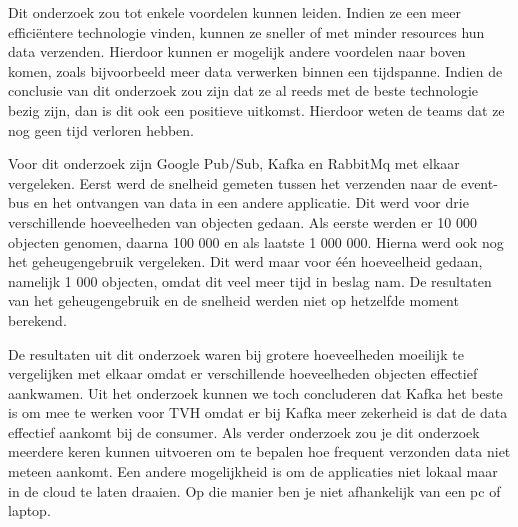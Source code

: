 Dit onderzoek zou tot enkele voordelen kunnen leiden. Indien ze een meer efficiëntere technologie vinden, kunnen ze sneller of met minder resources hun data verzenden. Hierdoor kunnen er mogelijk andere voordelen naar boven komen, zoals bijvoorbeeld meer data verwerken binnen een tijdspanne. Indien de conclusie van dit onderzoek zou zijn dat ze al reeds met de beste technologie bezig zijn, dan is dit ook een positieve uitkomst. Hierdoor weten de teams dat ze nog geen tijd verloren hebben.

Voor dit onderzoek zijn Google Pub/Sub, Kafka en RabbitMq met elkaar vergeleken. Eerst werd de snelheid gemeten tussen het verzenden naar de event-bus en het ontvangen van data in een andere applicatie. Dit werd voor drie verschillende hoeveelheden van objecten gedaan. Als eerste werden er 10 000 objecten genomen, daarna 100 000 en als laatste 1 000 000. Hierna werd ook nog het geheugengebruik vergeleken. Dit werd maar voor één hoeveelheid gedaan, namelijk 1 000 objecten, omdat dit veel meer tijd in beslag nam. De resultaten van het geheugengebruik en de snelheid werden niet op hetzelfde moment berekend. 

De resultaten uit dit onderzoek waren bij grotere hoeveelheden moeilijk te vergelijken met elkaar omdat er verschillende hoeveelheden objecten effectief aankwamen. Uit het onderzoek kunnen we toch concluderen dat Kafka het beste is om mee te werken voor TVH omdat er bij Kafka meer zekerheid is dat de data effectief aankomt bij de consumer. Als verder onderzoek zou je dit onderzoek meerdere keren kunnen uitvoeren om te bepalen hoe frequent verzonden data niet meteen aankomt. Een andere mogelijkheid is om de applicaties niet lokaal maar in de cloud te laten draaien. Op die manier ben je niet afhankelijk van een pc of laptop.
